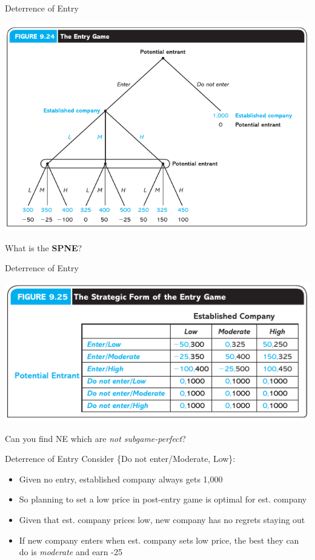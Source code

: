 
\begin{frame}{Deterrence of Entry}
  \begin{center}
    \includegraphics[width=.9\textwidth]{figures/fig924.png}
  \end{center} 
  What is the \textbf{SPNE}?
\end{frame}


\begin{frame}{Deterrence of Entry}
  \begin{center}
    \includegraphics[width=.9\textwidth]{figures/fig925.png}
  \end{center} 
  Can you find NE which are \textit{not subgame-perfect}?
\end{frame}


\begin{frame}{Deterrence of Entry}
  Consider \{Do not enter/Moderate, Low\}:
  \begin{itemize}
    \item Given no entry, established company always gets 1,000
    \item So planning to set a low price in post-entry game is optimal for est. company
    \item Given that est. company prices low, new company has no regrets staying out 
    \item If new company enters when est. company sets low price, the best they can do is \textit{moderate} and earn -25
  \end{itemize}
\end{frame}


